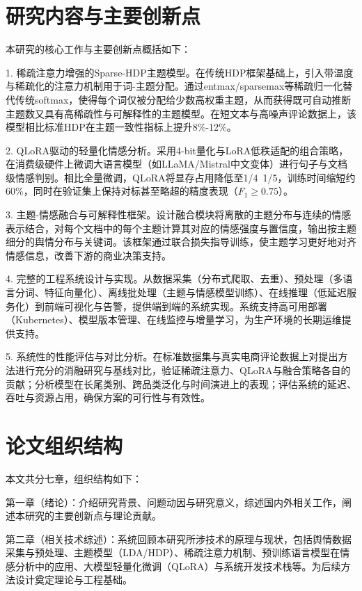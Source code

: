 \section{研究内容与主要创新点}
\label{sec:contributions}

本研究的核心工作与主要创新点概括如下：

1. 稀疏注意力增强的Sparse-HDP主题模型。在传统HDP框架基础上，引入带温度与稀疏化的注意力机制用于词-主题分配。通过entmax/sparsemax等稀疏归一化替代传统softmax，使得每个词仅被分配给少数高权重主题，从而获得既可自动推断主题数又具有高稀疏性与可解释性的主题模型。在短文本与高噪声评论数据上，该模型相比标准HDP在主题一致性指标上提升8\%-12\%。

2. QLoRA驱动的轻量化情感分析。采用4-bit量化与LoRA低秩适配的组合策略，在消费级硬件上微调大语言模型（如LLaMA/Mistral中文变体）进行句子与文档级情感判别。相比全量微调，QLoRA将显存占用降低至1/4~1/5，训练时间缩短约60\%，同时在验证集上保持对标甚至略超的精度表现（$F_1 \geq 0.75$）。

3. 主题-情感融合与可解释性框架。设计融合模块将离散的主题分布与连续的情感表示结合，对每个文档中的每个主题计算其对应的情感强度与置信度，输出按主题细分的舆情分布与关键词。该框架通过联合损失指导训练，使主题学习更好地对齐情感信息，改善下游的商业决策支持。

4. 完整的工程系统设计与实现。从数据采集（分布式爬取、去重）、预处理（多语言分词、特征向量化）、离线批处理（主题与情感模型训练）、在线推理（低延迟服务化）到前端可视化与告警，提供端到端的系统实现。系统支持高可用部署（Kubernetes）、模型版本管理、在线监控与增量学习，为生产环境的长期运维提供支持。

5. 系统性的性能评估与对比分析。在标准数据集与真实电商评论数据上对提出方法进行充分的消融研究与基线对比，验证稀疏注意力、QLoRA与融合策略各自的贡献；分析模型在长尾类别、跨品类泛化与时间演进上的表现；评估系统的延迟、吞吐与资源占用，确保方案的可行性与有效性。

\section{论文组织结构}
\label{sec:structure}

本文共分七章，组织结构如下：

第一章（绪论）：介绍研究背景、问题动因与研究意义，综述国内外相关工作，阐述本研究的主要创新点与理论贡献。

第二章（相关技术综述）：系统回顾本研究所涉技术的原理与现状，包括舆情数据采集与预处理、主题模型（LDA/HDP）、稀疏注意力机制、预训练语言模型在情感分析中的应用、大模型轻量化微调（QLoRA）与系统开发技术栈等。为后续方法设计奠定理论与工程基础。

